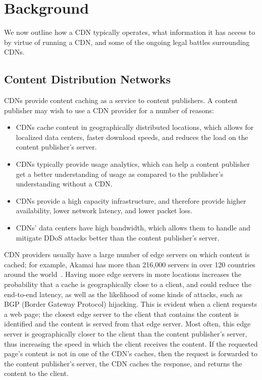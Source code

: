 \section{Background}
\label{sec:background}

We now outline how a CDN typically operates, what information it
has access to by virtue of running a CDN, and some of the ongoing legal battles
surrounding CDNs.

\subsection{Content Distribution Networks}
CDNs provide content caching as a service to content publishers.  A 
content publisher may wish to use a CDN provider for a number of reasons:

\begin{itemize}
\item CDNs cache content in geographically distributed locations, which allows for localized 
data centers, faster download speeds, and reduces the load on the content publisher's server.
\item CDNs typically provide usage analytics, which can help a content publisher get a better 
understanding of usage as compared to the publisher's understanding without a CDN.
\item CDNs provide a high capacity infrastructure, and therefore provide higher availability, 
lower network latency, and lower packet loss.  
\item CDNs' data centers have high bandwidth, which allows them to handle and mitigate DDoS attacks better 
than the content publisher's server.
\end{itemize}

CDN providers usually have a large number of edge servers on which content is cached; for example, 
Akamai has more than 216,000 servers in over 120 countries around the world~\cite{akamai_facts}.  
Having more edge servers in more locations increases the probability that a cache is geographically 
close to a client, and could reduce the end-to-end latency, as well as the likelihood of some kinds of 
attacks, such as BGP (Border Gateway Protocol) hijacking.  This is evident when a client requests a web page; the closest 
edge server to the client that contains the content is identified and the content is served from that 
edge server.  Most often, this edge server is geographically closer to the client than the content publisher's 
server, thus increasing the speed in which the client receives the content. If the requested page's content is 
not in one of the CDN's caches, then the request is forwarded to the content publisher's server, the CDN 
caches the response, and returns the content to the client. 

